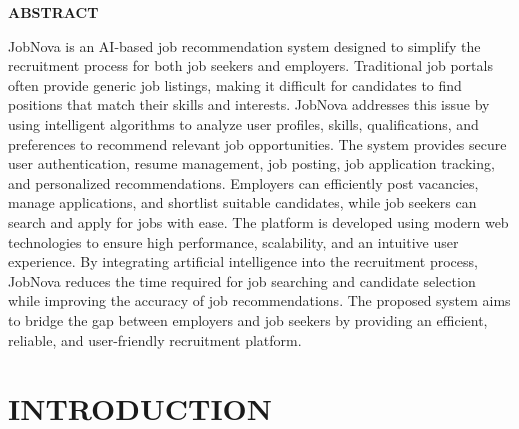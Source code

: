 \documentclass[12pt,a4paper]{report}
\begin{document}
\begin{center}
            
            \centering
            \vspace{3cm} %

            {\Huge \textbf{\textcolor{primaryblue}{ABSTRACT}}} 
            
            \vspace{2.5cm} %

            \parbox{\linewidth}{ 
                \setlength{\parskip}{1.5em} %
                \onehalfspacing             %
                \large                      %
                
                JobNova is an AI-based job recommendation system designed to simplify the recruitment process for both job seekers and employers. Traditional job portals often provide generic job listings, making it difficult for candidates to find positions that match their skills and interests. JobNova addresses this issue by using intelligent algorithms to analyze user profiles, skills, qualifications, and preferences to recommend relevant job opportunities. The system provides secure user authentication, resume management, job posting, job application tracking, and personalized recommendations. Employers can efficiently post vacancies, manage applications, and shortlist suitable candidates, while job seekers can search and apply for jobs with ease. The platform is developed using modern web technologies to ensure high performance, scalability, and an intuitive user experience. By integrating artificial intelligence into the recruitment process, JobNova reduces the time required for job searching and candidate selection while improving the accuracy of job recommendations. The proposed system aims to bridge the gap between employers and job seekers by providing an efficient, reliable, and user-friendly recruitment platform.
            }
\end{center}

\newpage

\tableofcontents
\cleardoublepage        %
{}
\setcounter{page}{1}
\newpage


\chapter{INTRODUCTION}
\end{document}
